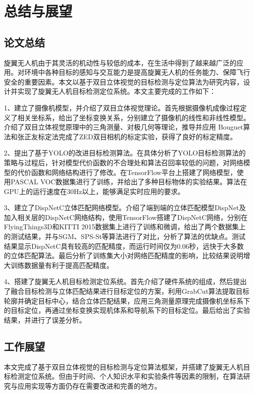 
\chapter{总结与展望}

\section{论文总结}
旋翼无人机由于其灵活的机动性与较低的成本，在生活中得到了越来越广泛的应用。对环境中各种目标的感知与交互能力是提高旋翼无人机的任务能力、保障飞行安全的重要因素。本文以基于双目立体视觉的目标检测与定位算法为研究内容，设计并实现了旋翼无人机目标检测定位系统。本文主要完成的工作如下：

1、建立了摄像机模型，并介绍了双目立体视觉理论。首先根据摄像机成像过程定义了相关坐标系，给出了坐标变换关系，分别建立了摄像机的线性和非线性模型。介绍了双目立体视觉原理中的三角测量、对极几何等理论，推导并应用 Bouguet算法和张正友标定法完成了ZED双目相机的标定实验，获得了良好的标定精度。 

2、提出了基于YOLO的改进目标检测算法。在具体分析了YOLO目标检测算法的策略与过程后，针对模型代价函数的不合理处和算法召回率较低的问题，对网络模型的代价函数和网络结构进行了修改。在TensorFlow平台上搭建了网络模型，使用PASCAL VOC数据集进行了训练，并给出了多种目标物体的实验结果。算法在GPU上的运行速度在30Hz以上，能够满足实时应用的要求。 

3、建立了DispNetC立体匹配网络模型。介绍了端到端的立体匹配模型DispNet及加入相关层的DispNetC网络结构，使用TensorFlow搭建了DispNetC网络，分别在FlyingThings3D和KITTI 2015数据集上进行了训练和微调，给出了两个数据集上的测试结果，并与SGM、SPS-St等算法进行了对比，分析了算法的优缺点。测试结果显示DispNetC具有较高的匹配精度，而运行时间仅为0.06秒，远快于大多数的立体匹配算法。最后分析了训练集大小对网络匹配精度的影响，比较结果说明增大训练数据量有利于提高匹配精度。 

4、搭建了旋翼无人机目标检测定位系统。首先介绍了硬件系统的组成，然后提出了融合目标检测与立体匹配结果进行目标定位的方案，利用GrabCut算法提取目标轮廓并确定目标中心，结合立体匹配结果，应用三角测量原理完成摄像机坐标系下的目标定位，再通过坐标变换实现机体系和导航系下的目标定位。最后给出了实验结果，并进行了误差分析。 

\vfill

\section{工作展望}
本文完成了基于双目立体视觉的目标检测与定位算法框架，并搭建了旋翼无人机目标检测定位系统。但由于时间、个人知识水平和实验条件等因素的限制，在算法研究与应用实现等方面仍存在需要改进和完善的地方。

